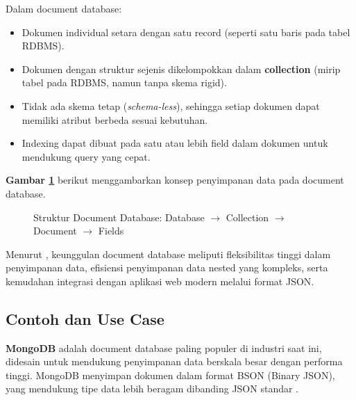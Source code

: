 Dalam document database:
\begin{itemize}
	\item Dokumen individual setara dengan satu record (seperti satu baris pada tabel RDBMS).
	\item Dokumen dengan struktur sejenis dikelompokkan dalam \textbf{collection} (mirip tabel pada RDBMS, namun tanpa skema rigid).
	\item Tidak ada skema tetap (\textit{schema-less}), sehingga setiap dokumen dapat memiliki atribut berbeda sesuai kebutuhan.
	\item Indexing dapat dibuat pada satu atau lebih field dalam dokumen untuk mendukung query yang cepat.
\end{itemize}

\textbf{Gambar \ref{fig:docdb_structure}} berikut menggambarkan konsep penyimpanan data pada document database.

\begin{figure}[h]
	\centering
	\caption{Struktur Document Database: Database $\rightarrow$ Collection $\rightarrow$ Document $\rightarrow$ Fields}
	\label{fig:docdb_structure}
\end{figure}


Menurut \cite{moniruzzaman2013nosql}, keunggulan document database meliputi fleksibilitas tinggi dalam penyimpanan data, efisiensi penyimpanan data nested yang kompleks, serta kemudahan integrasi dengan aplikasi web modern melalui format JSON.

\subsection{Contoh dan Use Case}

\textbf{MongoDB} adalah document database paling populer di industri saat ini, didesain untuk mendukung penyimpanan data berskala besar dengan performa tinggi. MongoDB menyimpan dokumen dalam format BSON (Binary JSON), yang mendukung tipe data lebih beragam dibanding JSON standar \cite{mongodb2023doc}.

